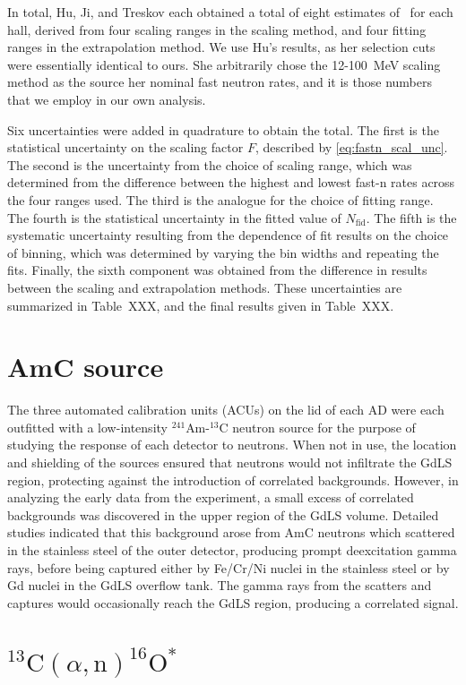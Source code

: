 \documentclass[../thesis.tex]{subfiles}
\begin{document}
In total, Hu, Ji, and Treskov each obtained a total of eight estimates of \rfn\
for each hall, derived from four scaling ranges in the scaling method, and four
fitting ranges in the extrapolation method. We use Hu's results, as her
selection cuts were essentially identical to ours. She arbitrarily chose the
12-100~MeV scaling method as the source her nominal fast neutron rates, and it
is those numbers that we employ in our own analysis.

Six uncertainties were added in quadrature to obtain the total. The first is the
statistical uncertainty on the scaling factor $F$, described by
\eqref{eq:fastn_scal_unc}. The second is the uncertainty from the choice of
scaling range, which was determined from the difference between the highest and
lowest fast-n rates across the four ranges used. The third is the analogue for
the choice of fitting range. The fourth is the statistical uncertainty in the
fitted value of $N_\mathrm{fid}$. The fifth is the systematic uncertainty
resulting from the dependence of fit results on the choice of binning, which was
determined by varying the bin widths and repeating the fits. Finally, the sixth
component was obtained from the difference in results between the scaling and
extrapolation methods. These uncertainties are summarized in Table~XXX, and the
final results given in Table~XXX.

\section{AmC source}

The three automated calibration units (ACUs) on the lid of each AD were each
outfitted with a low-intensity $^{241}$Am-$^{13}$C neutron source for the
purpose of studying the response of each detector to neutrons. When not in use,
the location and shielding of the sources ensured that neutrons would not
infiltrate the GdLS region, protecting against the introduction of correlated
backgrounds. However, in analyzing the early data from the experiment, a small
excess of correlated backgrounds was discovered in the upper region of the GdLS
volume. Detailed studies indicated that this background arose from AmC neutrons
which scattered in the stainless steel of the outer detector, producing prompt
deexcitation gamma rays, before being captured either by Fe/Cr/Ni nuclei in the
stainless steel or by Gd nuclei in the GdLS overflow tank. The gamma rays from
the scatters and captures would occasionally reach the GdLS region, producing a
correlated signal.

\section{$^{13}\mathrm{C}(\alpha, \mathrm{n})^{16}\mathrm{O}^*$}
\end{document}

